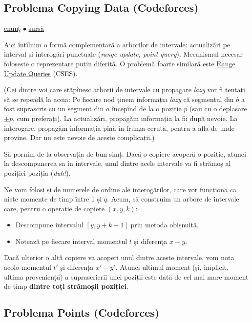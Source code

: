 \subsection{Problema Copying Data (Codeforces)}

\href{https://codeforces.com/contest/292/problem/E}{enunț}
$\bullet$
\href{https://codeforces.com/contest/292/submission/281463235}{sursă}

Aici întîlnim o formă complementară a arborilor de intervale: actualizări pe interval și interogări punctuale (\textit{range update, point query}). Mecanismul necesar folosește o reprezentare puțin diferită. O problemă foarte similară este \href{https://cses.fi/problemset/task/1651}{Range Update Queries} (CSES).

(Cei dintre voi care stăpînesc arborii de intervale cu propagare \textit{lazy} vor fi tentați să se repeadă la aceia: Pe fiecare nod ținem informația \textit{lazy} că segmentul din $b$ a fost suprascris cu un segment din $a$ începînd de la o poziție $p$ (sau cu o deplasare $\pm p$, cum preferați). La actualizări, propagăm informația la fii după nevoie. La interogare, propagăm informația pînă în frunza cerută, pentru a afla de unde provine. Dar nu este nevoie de aceste complicații.)

Să pornim de la observația de bun simț: Dacă o copiere acoperă o poziție, atunci la descompunerea sa în intervale, unul dintre acele intervale va fi strămoș al poziției poziția (\textit{duh!}).

Ne vom folosi și de numerele de ordine ale interogărilor, care vor funcționa ca niște momente de timp între 1 și $q$. Acum, să construim un arbore de intervale care, pentru o operație de copiere $(x, y, k)$:

\begin{itemize}
  \item Descompune intervalul $[y, y + k - 1]$ prin metoda obișnuită.
  \item Notează pe fiecare interval momentul $t$ și diferența $x-y$.
\end{itemize}

Dacă ulterior o altă copiere va acoperi unul dintre aceste intervale, vom nota acolo momentul $t'$ și diferența $x'-y'$. Atunci ultimul moment (și, implicit, ultima proveniență) a suprascrierii unei poziții este dată de cel mai mare moment de timp \textbf{dintre toți strămoșii poziției}.

\subsection{Problema Points (Codeforces)}

